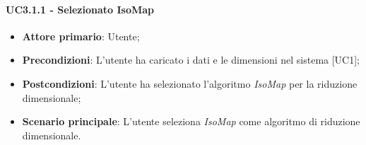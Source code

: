 \paragraph{UC3.1.1 - Selezionato IsoMap}
\begin{itemize}
	\item \textbf{Attore primario}: Utente;
	\item \textbf{Precondizioni}: L'utente ha caricato i dati e le dimensioni nel sistema [UC1];
	\item \textbf{Postcondizioni}: L'utente ha selezionato l'algoritmo \textit{IsoMap} per la riduzione dimensionale;
	\item \textbf{Scenario principale}: L'utente seleziona \textit{IsoMap} come algoritmo di riduzione dimensionale.
\end{itemize}
